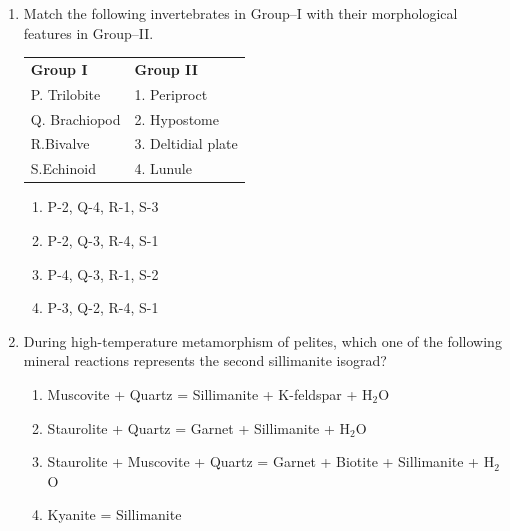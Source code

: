 \documentclass[journal,12pt,onecolumn]{IEEEtran}
\begin{document}
\begin{enumerate}
\hfill{}

\begin{multicols}{4}
\begin{enumerate}
\item Uniaxial positive
\item Biaxial positive
\item Uniaxial negative
\item Biaxial negative
\end{enumerate}
\end{multicols}

\item Match the following invertebrates in Group--I with their morphological features in Group--II.  

\begin{tabular}{p{} p{}}
\textbf{Group I} & \textbf{Group II} \\
P. Trilobite & 1. Periproct \\
Q. Brachiopod & 2. Hypostome\\
 
R.Bivalve & 3. Deltidial plate  \\
S.Echinoid& 4. Lunule  \\
\end{tabular}   

\hfill{}


\begin{enumerate}
\item P-2, Q-4, R-1, S-3
\item P-2, Q-3, R-4, S-1
\item P-4, Q-3, R-1, S-2
\item P-3, Q-2, R-4, S-1
\end{enumerate}


\item During high-temperature metamorphism of pelites, which one of the following mineral reactions represents the second sillimanite isograd?  

\hfill{}


\begin{enumerate}
\item Muscovite + Quartz = Sillimanite + K-feldspar + H$_2$O
\item Staurolite + Quartz = Garnet + Sillimanite + H$_2$O
\item Staurolite + Muscovite + Quartz = Garnet + Biotite + Sillimanite + H$_2$O
\item Kyanite = Sillimanite
\end{enumerate}



\end{enumerate}
\end{document}
